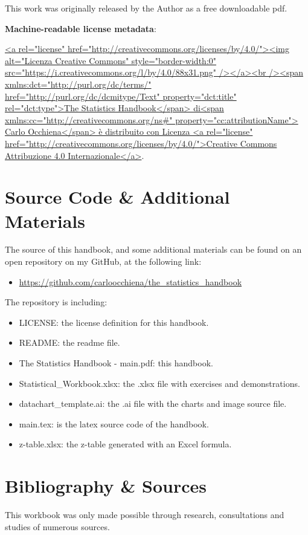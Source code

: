 \documentclass{article}
\begin{document}
This work was originally released by the Author as a free downloadable pdf. 

\textbf{Machine-readable license metadata}:\\
\begin{sloppypar}
\url{<a rel="license" href="http://creativecommons.org/licenses/by/4.0/"><img alt="Licenza Creative Commons" style="border-width:0" src="https://i.creativecommons.org/l/by/4.0/88x31.png" /></a><br /><span xmlns:dct="http://purl.org/dc/terms/" href="http://purl.org/dc/dcmitype/Text" property="dct:title" rel="dct:type">The Statistics Handbook</span> di<span xmlns:cc="http://creativecommons.org/ns#" property="cc:attributionName"> Carlo Occhiena</span> è distribuito con Licenza <a rel="license" href="http://creativecommons.org/licenses/by/4.0/">Creative Commons Attribuzione 4.0 Internazionale</a>}.
\end{sloppypar}

\section{Source Code \& Additional Materials}
The source of this handbook, and some additional materials can be found on an open repository on my GitHub, at the following link:
\begin{itemize}
    \item \url{https://github.com/carloocchiena/the_statistics_handbook}
\end{itemize}

The repository is including:
\begin{itemize}
    \item LICENSE: the license definition for this handbook.
    \item README: the readme file.
    \item The Statistics Handbook - main.pdf: this handbook.
    \item Statistical\_Workbook.xlsx: the .xlsx file with exercises and demonstrations.
    \item datachart\_template.ai: the .ai file with the charts and image source file.
    \item main.tex: is the latex source code of the handbook.
    \item z-table.xlsx: the z-table generated with an Excel formula.
\end{itemize}

\section{Bibliography \& Sources}
This workbook was only made possible through research, consultations and studies of numerous sources. 
\end{document}
